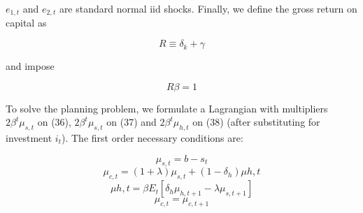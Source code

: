 \documentclass[a4paper,12pt]{scrartcl} %
\begin{document}
$e_{1,t}$ and $e_{2,t}$ are standard normal iid shocks. Finally, we define the gross return on capital as

\begin{equation}\label{43}
R\equiv \delta_k+\gamma
\end{equation}

and impose

\begin{equation}\label{44}
R\beta=1
\end{equation}

To solve the planning problem, we formulate a Lagrangian with multipliers $2\beta^t\mu_{s,t}$ on (36), $2\beta^t\mu_{s,t}$ on (37) and $2\beta^t\mu_{h,t}$ on (38) (after substituting for investment $i_t$). The first order necessary conditions are:

\begin{equation}\label{45}
\mu_{s,t}=b-s_t
\end{equation}
\begin{equation}\label{46}
\mu_{c,t}=(1+\lambda)\mu_{s,t}+(1-\delta_h)\mu{h,t}
\end{equation}
\begin{equation}\label{47}
\mu{h,t}=\beta E_t[\delta_h\mu_{h,t+1}-\lambda \mu_{s,t+1}]
\end{equation}
\begin{equation}\label{48}
\mu_{c,t}=\mu_{c,t+1}
\end{equation}
\end{document}

